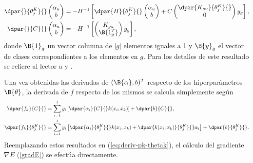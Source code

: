 \begin{align}
  \dpar{}{\theta^K_j}{} \begin{pmatrix}\alpha_{u}\\b\end{pmatrix} &=
    -H^{-1} \left[
      \dpar{H}{\theta^K_j}{}
      \begin{pmatrix}\alpha_{u}\\b\end{pmatrix}
        +C \begin{pmatrix}\dpar{K_{gu}}{\theta^K_j}{}\\0\end{pmatrix}
          y_g
          \right], \\
  \dpar{}{C}{} \begin{pmatrix}\alpha_{u}\\b\end{pmatrix} &=
    -H^{-1} \left[
      \begin{pmatrix}{K_{gu}}\\\B{1_g^T}\end{pmatrix} y_g
      \right],
\end{align}
%
donde $\B{1}_g$ un vector columna de $|g|$ elementos iguales a 1 y
$\B{y}_g$ el vector de clases correspondientes a los elementos en
$g$. Para los detalles de este resultado se refiere al lector a
\cite{glasmachers} y \cite{keerthi}.

Una vez obtenidas las derivadas de $({\B{\alpha},b})^T$ respecto de
los hiperparámetros $\B{\theta}$, la derivada de $f$  respecto
de los mismos se calcula simplemente según
%
\begin{align}
  \dpar{f_k}{C}{} &=  \sum_{i=1}^l y_i\left[
    \dpar{\alpha_i}{C}{} k(x_i,x_k) \right]
  + \dpar{b}{C}{} ,\\
  \dpar{f_k}{\theta^K_j}{} &=  \sum_{i=1}^l y_i \left[
    \dpar{\alpha_i}{\theta^K_j}{} k(x_i,x_k) +
    \dpar{k(x_i,x_k)}{\theta^K_j}{} \alpha_i \right]
  + \dpar{b}{\theta^K_j}{}.
\end{align}
%
Reemplazando estos resultados en (\ref{eq:deriv-pk-thetak}), el cálculo
del gradiente $\nabla{}E$ (\ref{gradE}) se efectúa directamente.
